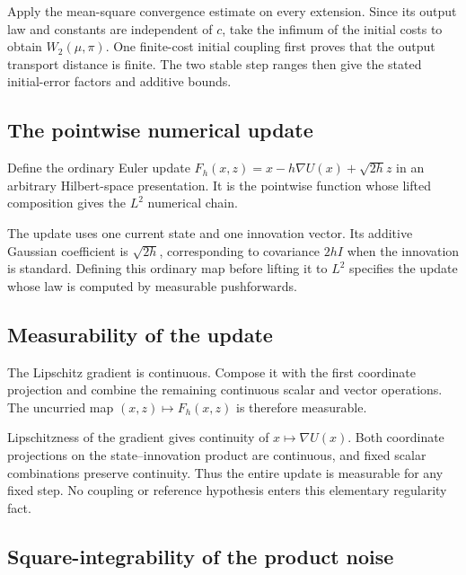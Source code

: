 \documentclass[11pt,a4paper]{article}
\begin{document}
Apply the mean-square convergence estimate on every extension. Since its output law and constants are independent of \(c\), take the infimum of the initial costs to obtain \(W_2(\mu,\pi)\). One finite-cost initial coupling first proves that the output transport distance is finite. The two stable step ranges then give the stated initial-error factors and additive bounds.


\subsection{\texorpdfstring{The pointwise numerical update}{The pointwise numerical update}}


Define the ordinary Euler update \(F_h(x,z)=x-h\nabla U(x)+\sqrt{2h}z\) in an arbitrary Hilbert-space presentation. It is the pointwise function whose lifted composition gives the \(L^2\) numerical chain.



The update uses one current state and one innovation vector. Its additive Gaussian coefficient is \(\sqrt{2h}\), corresponding to covariance \(2hI\) when the innovation is standard. Defining this ordinary map before lifting it to \(L^2\) specifies the update whose law is computed by measurable pushforwards.


\subsection{\texorpdfstring{Measurability of the update}{Measurability of the update}}


The Lipschitz gradient is continuous. Compose it with the first coordinate projection and combine the remaining continuous scalar and vector operations. The uncurried map \((x,z)\mapsto F_h(x,z)\) is therefore measurable.



Lipschitzness of the gradient gives continuity of \(x\mapsto\nabla U(x)\). Both coordinate projections on the state–innovation product are continuous, and fixed scalar combinations preserve continuity. Thus the entire update is measurable for any fixed step. No coupling or reference hypothesis enters this elementary regularity fact.


\subsection{\texorpdfstring{Square-integrability of the product noise}{Square-integrability of the product noise}}
\end{document}
